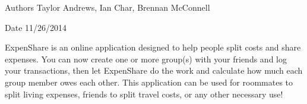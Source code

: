 \begin{DoxyAuthor}{Authors}
Taylor Andrews, Ian Char, Brennan Mc\-Connell 
\end{DoxyAuthor}
\begin{DoxyDate}{Date}
11/26/2014
\end{DoxyDate}
Expen\-Share is an online application designed to help people split costs and share expenses. You can now create one or more group(s) with your friends and log your transactions, then let Expen\-Share do the work and calculate how much each group member owes each other. This application can be used for roommates to split living expenses, friends to split travel costs, or any other necessary use! 